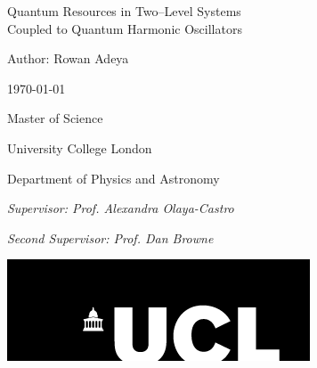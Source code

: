 \documentclass[11pt]{article}
\begin{document}
\begin{titlepage}
    \centering
    {\Huge {Quantum Resources in Two--Level Systems\\
    Coupled to Quantum Harmonic Oscillators}\par}

        
    \vspace{4cm}
    {\large Author: Rowan Adeya \par}
    {\large \today \par}
    
    \vspace{4cm}
    {\Large Master of Science \par}
    \vspace{0.3cm}
    {\Large University College London \par}
    \vspace{0.3cm}
    {\Large Department of Physics and Astronomy \par}
    \vspace{2.5cm}
    {\large \textit{Supervisor: Prof. Alexandra Olaya-Castro} \par}
    {\large \textit{Second Supervisor: Prof. Dan Browne} \par}
    \vspace{4cm}
    \includegraphics[scale=0.7]{Images/ucl_logo.png}\par
    


    
\end{titlepage}


\newpage

\vspace{\fill}
\begin{abstract}
    Quantum resources are key to retaining fundamental quantum properties of a system. This work aims to investigate how the quantum resources of entanglement and coherence manifest in systems which can be represented by a two-level system coupled to a quantum harmonic oscillator model. Such models represent a plethora of physical and experimental systems, such as atoms trapped in a cavity, dimers which are coupled to the vibrations of a molecule, and nitrogen--vacany centres in nanocrystals. Harnessing entanglement and coherence would enable systems to remain in non--classical states for longer periods, and thus be studied and maintained. 
\end{abstract}
\vspace{\fill}
\end{document}
